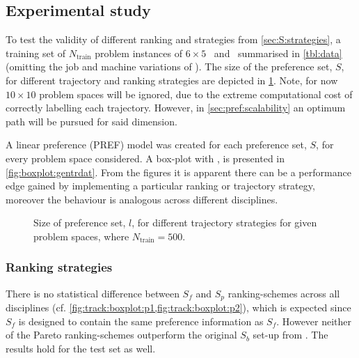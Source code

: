 \subsection{Experimental study}\label{sec:expr:locallin}
To test the validity of different ranking and strategies from \cref{sec:S:strategies}, a training set of $N_{\text{train}}$ problem instances of $6\times5$ \jsp\ and \fsp\ summarised in \cref{tbl:data} (omitting the job and machine variations of \jsp). The size of the preference set, $S$, for different trajectory and ranking strategies are depicted in \cref{fig:sizeofprefset}. Note, for now $10\times10$ problem spaces will be ignored, due to the extreme computational cost of correctly labelling each trajectory. However, in \cref{sec:pref:scalability} an optimum path will be pursued for said dimension.

A linear preference (PREF) model was created for each preference set, $S$, for every problem space considered. A box-plot with \fullnamerho, is presented in \cref{fig:boxplot:gentrdat}. %
From the figures it is apparent there can be a performance edge gained by implementing a particular ranking or trajectory strategy, moreover the behaviour is analogous across different disciplines. 


\begin{figure}
\caption{Size of preference set, $l$, for different trajectory strategies for given problem spaces, where $N_{\text{train}}=500$. }
\label{fig:sizeofprefset}
\end{figure}


\subsubsection{Ranking strategies}
There is no statistical difference between $S_f$ and $S_p$ ranking-schemes across all disciplines (cf. \cref{fig:track:boxplot:p1,fig:track:boxplot:p2}), which is expected since $S_f$ is designed to contain the same preference information as $S_f$. However neither of the Pareto ranking-schemes outperform the original $S_b$ set-up from \cite{InRu11a}. The results hold for the test set as well. 

